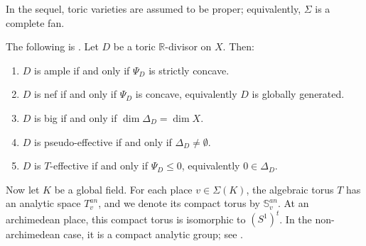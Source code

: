 \documentclass[10pt,a4paper]{amsart}
\theoremstyle{plain}
\theoremstyle{plain}
\numberwithin{equation}{section}
\begin{document}
In the sequel, toric varieties are assumed to be proper; equivalently,
\(\Sigma\) is a complete fan.
\begin{prop}
	The following is \cite[Propositions 4.7--4.9]{BMPS22}.  Let \(D\) be a toric
	\(\mathbb R\)-divisor on \(X\).  Then:
	\begin{enumerate}[label=\textup{(\arabic*)},leftmargin=2em]
		\item \(D\) is ample if and only if \(\Psi_D\) is strictly concave.
		\item \(D\) is nef if and only if \(\Psi_D\) is concave, equivalently \(D\)
		is globally generated.
		\item \(D\) is big if and only if \(\dim\Delta_D=\dim X\).
		\item \(D\) is pseudo-effective if and only if \(\Delta_D\neq\emptyset\).
		\item \(D\) is \(T\)-effective if and only if \(\Psi_D\leq0\), equivalently
		\(0\in\Delta_D\).
	\end{enumerate}
\end{prop}


Now let \(K\) be a global field.  For each place \(v\in\Sigma(K)\), the
algebraic torus \(T\) has an analytic space \(T^{an}_v\), and we denote its
compact torus by \(\mathbb S_v^{an}\).  At an archimedean place, this compact
torus is isomorphic to \((S^1)^t\).  In the non-archimedean case, it is a
compact analytic group; see \cite[\S4.2]{BPS14}.
\end{document}
